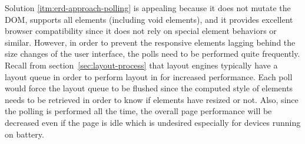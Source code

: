 \documentclass[a4paper,11pt]{kth-mag}
\begin{document}
        Solution \ref{itm:erd-approach-polling} is appealing because it does not mutate the \gls{DOM}, supports all elements (including void elements), and it provides excellent \gls{browser} compatibility since it does not rely on special \gls{element} behaviors or similar.
        However, in order to prevent the \gls{responsive} \glspl{element} lagging behind the size changes of the user interface, the polls need to be performed quite frequently.
        Recall from section~\ref{sec:layout-process} that \glspl{layout engine} typically have a layout queue in order to perform layout in  for increased performance.
        Each poll would force the layout queue to be flushed since the computed style of \glspl{element} needs to be retrieved in order to know if \glspl{element} have resized or not.
        Also, since the polling is performed all the time, the overall page performance will be decreased even if the page is idle which is undesired especially for devices running on battery.
\end{document}
